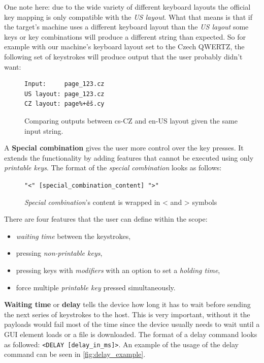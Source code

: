 One note here: due to the wide variety of different keyboard layouts the official key mapping is only compatible with the \emph{US layout}. What that means is that if the target's machine uses a different keyboard layout than the \emph{US layout} some keys or key combinations will produce a different string than expected. So for example with our machine's keyboard layout set to the Czech QWERTZ, the following set of keystrokes will produce output that the user probably didn't want:
\begin{figure}[ht]
\label{fig:layout_comparison}
\centering
\begin{varwidth}{\linewidth}
\begin{verbatim}
Input:     page_123.cz
US layout: page_123.cz
CZ layout: page%+ěš.cy
\end{verbatim}
\end{varwidth}
\caption{Comparing outputs between cs-CZ and en-US layout given the same input string.}
\end{figure}

A \textbf{Special combination} gives the user more control over the key presses. It extends the functionality by adding features that cannot be executed using only \emph{printable keys}. The format of the \emph{special combination} looks as follows: 

\begin{figure}[ht]
\label{fig:format_special}
\centering
\begin{varwidth}{\linewidth}
\verb|"<" [special_combination_content] ">"|
\end{varwidth}
\caption{\emph{Special combination}'s content is wrapped in < and > symbols}
\end{figure}

There are four features that the user can define within the scope:
\begin{itemize}
    \item \emph{waiting time} between the keystrokes,
    \item pressing \emph{non-printable keys},
    \item pressing keys with \emph{modifiers} with an option to set a \emph{holding time},
    \item force multiple \emph{printable key} pressed simultaneously.
\end{itemize}

\textbf{Waiting time} or \textbf{delay} tells the device how long it has to wait before sending the next series of keystrokes to the host. This is very important, without it the payloads would fail most of the time since the device usually needs to wait until a GUI element loads or a file is downloaded. The format of a delay command looks as followed: \verb|<DELAY [delay_in_ms]>|. An example of the usage of the delay command can be seen in \autoref{fig:delay_example}.

